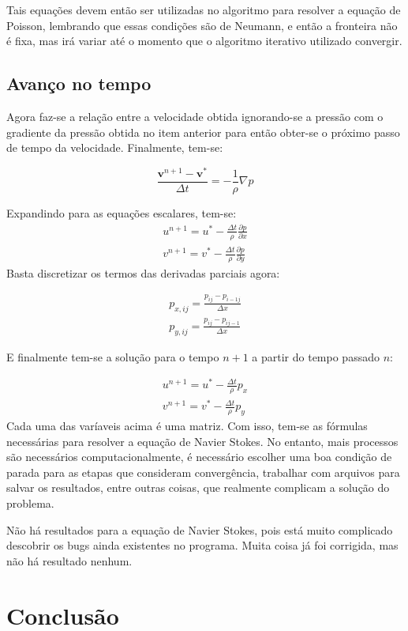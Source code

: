 \documentclass[journal]{IEEEtran}
\begin{document}
Tais equações devem então ser utilizadas no algoritmo para resolver a equação de Poisson, lembrando que essas condições são de Neumann, e então a fronteira não é fixa, mas irá variar até o momento que o algoritmo iterativo utilizado convergir.
\subsection{Avanço no tempo}
Agora faz-se a relação entre a velocidade obtida ignorando-se a pressão com o gradiente da pressão obtida no item anterior para então obter-se o próximo passo de tempo da velocidade. Finalmente, tem-se: 

\begin{equation}
\frac{\textbf{v}^{n+1}-\textbf{v}^*}{\Delta t}=-\frac{1}{\rho}\nabla p
\end{equation}

Expandindo para as equações escalares, tem-se:
\begin{eqnarray}
u^{n+1}=u^*-\frac{\Delta t}{\rho}\frac{\partial p}{\partial x}\\
v^{n+1}=v^*-\frac{\Delta t}{\rho}\frac{\partial p}{\partial y}
\end{eqnarray}
Basta discretizar os termos das derivadas parciais agora:

\begin{eqnarray}
p_{x,ij}=\frac{p_{ij}-p_{i-1j}}{\Delta x}\\
p_{y,ij}=\frac{p_{ij}-p_{ij-1}}{\Delta x}
\end{eqnarray}

E finalmente tem-se a solução para o tempo $n+1$ a partir do tempo passado $n$:

\begin{eqnarray}
u^{n+1}=u^*-\frac{\Delta t}{\rho}p_x\\
v^{n+1}=v^*-\frac{\Delta t}{\rho}p_y
\end{eqnarray}
Cada uma das varíaveis acima é uma matriz. Com isso, tem-se as fórmulas necessárias para resolver a equação de Navier Stokes. No entanto, mais processos são necessários computacionalmente, é necessário escolher uma boa condição de parada para as etapas que consideram convergência, trabalhar com arquivos para salvar os resultados, entre outras coisas, que realmente complicam a solução do problema.

Não há resultados para a equação de Navier Stokes, pois está muito complicado descobrir os bugs ainda existentes no programa. Muita coisa já foi corrigida, mas não há resultado nenhum.
\section{Conclusão}
\end{document}
